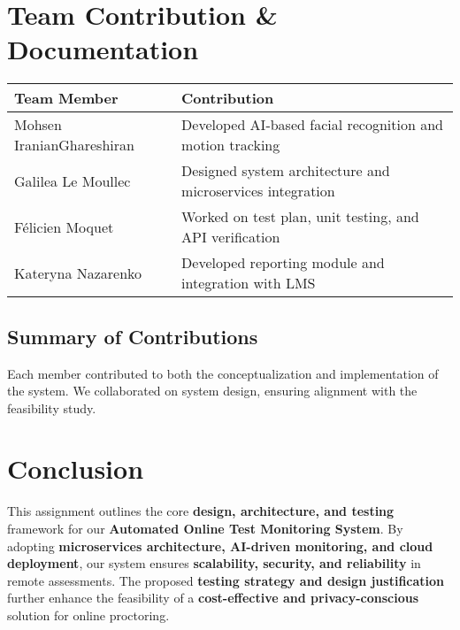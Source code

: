 \documentclass[12pt,a4paper]{article}
\begin{document}
\section{Team Contribution \& Documentation}

\begin{longtable}{|>{\raggedright\arraybackslash}p{4cm}|>{\raggedright\arraybackslash}p{10cm}|}
\hline
\textbf{Team Member} & \textbf{Contribution} \\ \hline
Mohsen IranianGhareshiran & Developed AI-based facial recognition and motion tracking \\ \hline
Galilea Le Moullec & Designed system architecture and microservices integration \\ \hline
Félicien Moquet & Worked on test plan, unit testing, and API verification \\ \hline
Kateryna Nazarenko & Developed reporting module and integration with LMS \\ \hline
\end{longtable}

\subsection{Summary of Contributions}
Each member contributed to both the conceptualization and implementation of the system. We collaborated on system design, ensuring alignment with the feasibility study.

\section{Conclusion}
This assignment outlines the core \textbf{design, architecture, and testing} framework for our \textbf{Automated Online Test Monitoring System}. By adopting \textbf{microservices architecture, AI-driven monitoring, and cloud deployment}, our system ensures \textbf{scalability, security, and reliability} in remote assessments. The proposed \textbf{testing strategy and design justification} further enhance the feasibility of a \textbf{cost-effective and privacy-conscious} solution for online proctoring.
\end{document}
